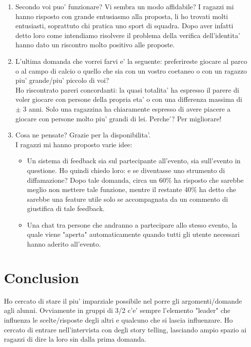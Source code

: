 \documentclass[12pt]{article}
\begin{document}
\begin{enumerate}
  \item Secondo voi puo' funzionare? Vi sembra un modo affidabile?
  I ragazzi mi hanno risposto con grande entusiasmo alla proposta, li ho trovati molti entusiasti, soprattuto chi pratica uno sport di squadra. Dopo aver infatti detto loro come intendiamo risolvere il problema della verifica dell'identita'
  hanno dato un riscontro molto positivo alle proposte.
  \item L'ultima domanda che vorrei farvi e' la seguente: preferireste giocare al parco o al campo di calcio o quello che sia con un vostro coetaneo o con un ragazzo piu'
  grande/piu' piccolo di voi? \\
  Ho riscontrato pareri concordanti: la quasi totalita' ha espresso il parere di voler giocare con persone della propria eta' o con una differenza massima di $\pm$ 3 anni. Solo una ragazzina ha chiaramente espresso di avere piacere a giocare
  con persone molto piu' grandi di lei. Perche'? Per migliorare!
  \item Cosa ne pensate? Grazie per la disponibilita'. \\
  I ragazzi mi hanno proposto varie idee:
  \begin{itemize}
    \item Un sistema di feedback sia sul partecipante all'evento, sia sull'evento in questione. Ho quindi chiedo loro: e se diventasse uno strumento di diffamazione? Dopo tale domanda, circa un 60\% ha risposto che sarebbe meglio non mettere
    tale funzione, mentre il restante 40\% ha detto che sarebbe una feature utile solo se accompagnata da un commento di giustifica di tale feedback.
    \item Una chat tra persone che andranno a partecipare allo stesso evento, la quale viene "aperta" automaticamente quando tutti gli utente necessari hanno aderito all'evento.
  \end{itemize}
\end{enumerate}

\section*{Conclusion}

Ho cercato di stare il piu' imparziale possibile nel porre gli argomenti/domande agli alunni. Ovviamente in gruppi di 3/2 c'e' sempre l'elemento "leader" che influenza le scelte/risposte
degli altri e qualcuno che si lascia influenzare. Ho cercato di entrare nell'intervista con degli story telling, lasciando ampio spazio ai ragazzi di dire la loro sin dalla prima domanda.
\end{document}
